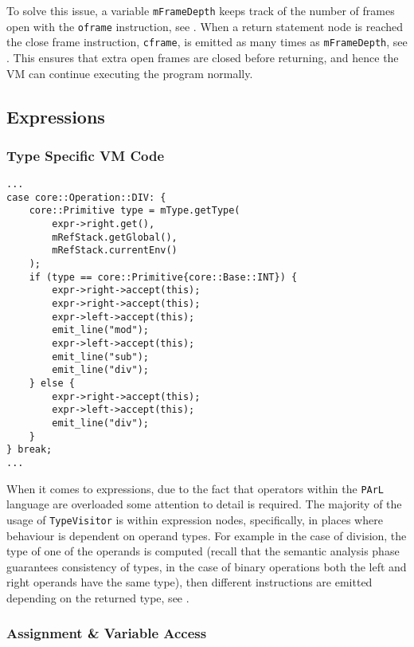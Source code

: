 To solve this issue, a variable \texttt{mFrameDepth} keeps track
of the number of frames open with the \texttt{oframe}
instruction, see . When a return statement
node is reached the close frame instruction, \texttt{cframe}, is
emitted as many times as \texttt{mFrameDepth}, see
. This ensures that extra open frames are
closed before returning, and hence the VM can continue executing
the program normally.

\subsection{Expressions}

\subsubsection{Type Specific VM Code}

\begin{lstlisting}[caption={A segment of the
\texttt{visit(Binary *)} method in the \texttt{GenVisitor} class
(ir\_gen/GenVisitor.cpp)}, label=lst:overloadeddiv]
...
case core::Operation::DIV: {
    core::Primitive type = mType.getType(
        expr->right.get(),
        mRefStack.getGlobal(),
        mRefStack.currentEnv()
    );
    if (type == core::Primitive{core::Base::INT}) {
        expr->right->accept(this);
        expr->right->accept(this);
        expr->left->accept(this);
        emit_line("mod");
        expr->left->accept(this);
        emit_line("sub");
        emit_line("div");
    } else {
        expr->right->accept(this);
        expr->left->accept(this);
        emit_line("div");
    }
} break;
...
\end{lstlisting}

When it comes to expressions, due to the fact that operators
within the \texttt{PArL} language are overloaded some attention
to detail is required. The majority of the usage of
\texttt{TypeVisitor} is within expression nodes, specifically,
in places where behaviour is dependent on operand types. For
example in the case of division, the type of one of the operands
is computed (recall that the semantic analysis phase guarantees
consistency of types, in the case of binary operations both the
left and right operands have the same type), then different
instructions are emitted depending on the returned type, see
.

\subsubsection{Assignment & Variable Access}

